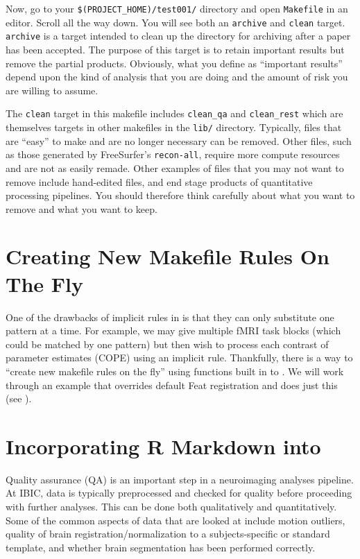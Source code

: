 Now, go to your \texttt{\$(PROJECT\_HOME)/test001/} directory and open \texttt{Makefile} in an editor. Scroll all the way down. You will see both an \texttt{archive} and \texttt{clean} target. \texttt{archive} is a target intended to clean up the directory for archiving after a paper has been accepted. The purpose of this target is to retain important results but remove the partial products. Obviously, what you define as ``important results'' depend upon the kind of analysis that you are doing and the amount of risk you are willing to assume.

The \texttt{clean} target in this makefile includes \texttt{clean\_qa} and \texttt{clean\_rest} which are themselves targets in other makefiles in the \texttt{lib/} directory. Typically, files that are ``easy'' to make and are no longer necessary can be removed. Other files, such as those generated by FreeSurfer's \texttt{recon-all}, require more compute resources and are not as easily remade. Other examples of files that you may not want to remove include hand-edited files, and end stage products of quantitative processing pipelines. You should therefore think carefully about what you want to remove and what you want to keep. 

\section{Creating New Makefile Rules On The Fly}
One of the drawbacks of implicit rules in \maken{} is that they can only substitute one pattern at a time. For example, we may give multiple fMRI task blocks (which could be matched by one pattern) but then wish to process each contrast of parameter estimates (COPE) using an implicit rule. Thankfully, there is a way to ``create new makefile rules on the fly'' using functions built in to \maken{}. We will work through an example that overrides default Feat registration and does just this (see ).


\section{Incorporating R Markdown into \maken{}}

Quality assurance (QA) is an important step in a neuroimaging analyses pipeline. At IBIC, data is typically preprocessed and checked for quality before proceeding with further analyses. This can be done both qualitatively and quantitatively. Some of the common aspects of data that are looked at include motion outliers, quality of brain registration/normalization to a subjects-specific or standard template, and whether brain segmentation has been performed correctly. 

